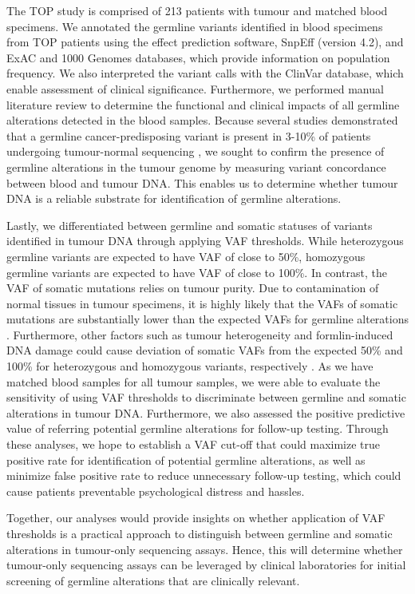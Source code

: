 The TOP study is comprised of 213 patients with tumour and matched blood specimens. We annotated the germline variants identified in blood specimens from TOP patients using the effect prediction software, SnpEff (version 4.2), and ExAC and 1000 Genomes databases, which provide information on population frequency. We also interpreted the variant calls with the ClinVar database, which enable assessment of clinical significance. Furthermore, we performed manual literature review to determine the functional and clinical impacts of all germline alterations detected in the blood samples. Because several studies demonstrated that a germline cancer-predisposing variant is present in 3-10\% of patients undergoing tumour-normal sequencing \cite{Raymond2016,Meric-Bernstam2016,Schrader2015,Jones2015a}, we sought to confirm the presence of germline alterations in the tumour genome by measuring variant concordance between blood and tumour DNA. This enables us to determine whether tumour DNA is a reliable substrate for identification of germline alterations.

Lastly, we differentiated between germline and somatic statuses of variants identified in tumour DNA through applying VAF thresholds. While heterozygous germline variants are expected to have VAF of close to 50\%, homozygous germline variants are expected to have VAF of close to 100\%. In contrast, the VAF of somatic mutations relies on tumour purity. Due to contamination of normal tissues in tumour specimens, it is highly likely that the VAFs of somatic mutations are substantially lower than the expected VAFs for germline alterations \cite{}. Furthermore, other factors such as tumour heterogeneity and formlin-induced DNA damage could cause deviation of somatic VAFs from the expected 50\% and 100\% for heterozygous and homozygous variants, respectively \cite{}. As we have matched blood samples for all tumour samples, we were able to evaluate the sensitivity of using VAF thresholds to discriminate between germline and somatic alterations in tumour DNA. Furthermore, we also assessed the positive predictive value of referring potential germline alterations for follow-up testing. Through these analyses, we hope to establish a VAF cut-off that could maximize true positive rate for identification of potential germline alterations, as well as minimize false positive rate to reduce unnecessary follow-up testing, which could cause patients preventable psychological distress and hassles.

Together, our analyses would provide insights on whether application of VAF thresholds is a practical approach to distinguish between germline and somatic alterations in tumour-only sequencing assays. Hence, this will determine whether tumour-only sequencing assays can be leveraged by clinical laboratories for initial screening of germline alterations that are clinically relevant.


